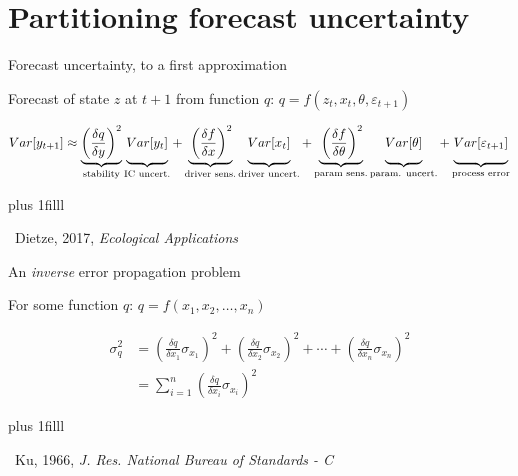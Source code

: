 \documentclass[12pt, compress, aspectratio=1610]{beamer}
\newcommand{\btVFill}{\vskip0pt plus 1filll}
\newcommand{\credit}[1]{\btVFill\par\hfill \footnotesize ~#1}
\begin{document}
\hypertarget{partitioning-forecast-uncertainty}{%
\section{Partitioning forecast
uncertainty}\label{partitioning-forecast-uncertainty}}

\begin{frame}{%
\protect\hypertarget{forecast-uncertainty-to-a-first-approximation}{%
Forecast uncertainty, to a first approximation}}

Forecast of state \(z\) at \(t+1\) from function \(q\):
\(q = f(z_t, x_t, \theta, \varepsilon_{t+1})\)

\small

\begin{align*}
Var[y_{t+1}] \approx \underbrace{\left(\frac{\delta q}{\delta y} \right)^2}_{\text{stability}} 
               \underbrace{\vphantom{ \left(\frac{\delta q}{\delta y} \right)^2 } Var[y_t]}_{\text{IC uncert.}} +
               \underbrace{\vphantom{ \left(\frac{\delta q}{\delta y} \right)^2 }\left(\frac{\delta f}{\delta x} \right)^2}_{\text{driver sens.}} 
               \underbrace{\vphantom{ \left(\frac{\delta q}{\delta y} \right)^2 } Var[x_t]}_{\text{driver uncert.}} +
               \underbrace{\vphantom{ \left(\frac{\delta q}{\delta y} \right)^2 }\left(\frac{\delta f}{\delta \theta} \right)^2}_{\text{param sens.}}
               \underbrace{\vphantom{ \left(\frac{\delta q}{\delta y} \right)^2 } Var[\theta]}_{\text{param. uncert.}} +
               \underbrace{\vphantom{ \left(\frac{\delta q}{\delta y} \right)^2 } Var[\varepsilon_{t+1}]}_{\text{process error}}
\end{align*}

\credit{Dietze, 2017, \emph{Ecological Applications}}

\end{frame}

\begin{frame}{%
\protect\hypertarget{an-error-propagation-problem}{%
An \emph{inverse} error propagation problem}}

For some function \(q\): \(q = f(x_1,x_2,\dots,x_n)\)

\begin{align*}
\sigma^2_q &= \left( \frac{\delta q}{\delta x_1} \sigma_{x_1} \right)^2 + \left( \frac{\delta q}{\delta x_2} \sigma_{x_2} \right)^2 + \cdots + \left( \frac{\delta q}{\delta x_n} \sigma_{x_n} \right)^2 \\
&= \sum^n_{i=1}\left( \frac{\delta q}{\delta x_i} \sigma_{x_i} \right)^2
\end{align*}

\credit{Ku, 1966, \emph{J. Res. National Bureau of Standards - C}}

\end{frame}
\end{document}
